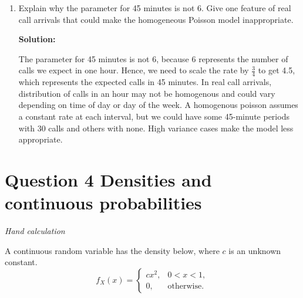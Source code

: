 \documentclass[11pt]{article}
\newcommand{\solution}{\par\medskip\noindent\textbf{Solution:}\par\vspace{0cm}}
\begin{document}
\begin{enumerate}[label=\textbf{(\alph*)}]
  Hence, now that we have the first and second moments of $Y$, we can derive the variance of $Y$:
  \[
  Var(Y) = \mathbb{E}Y^2 - (\mathbb{E}Y)^2 = 4.5^2 + 4.5 - 4.5^2 = 4.5 = \lambda
  \]


  \item Explain why the parameter for 45 minutes is not 6. Give one feature of real call arrivals that could make the homogeneous Poisson model inappropriate.
  \solution

  The parameter for 45 minutes is not 6, because 6 represents the number of calls we expect in one hour. Hence, we need to scale the rate by $\frac{3}{4}$ to get 4.5, which represents the expected calls in 45 minutes.
  In real call arrivals, distribution of calls in an hour may not be homogenous and could vary depending on time of day or day of the week. A homogenous poisson assumes a constant rate at each interval, but we could have some 45-minute periods with 30 calls and others with none. High variance cases make the model less appropriate.

\end{enumerate}

\newpage
\section*{Question 4 \quad Densities and continuous probabilities}
\textit{Hand calculation}

A continuous random variable has the density below, where $c$ is an unknown constant.
\[
f_X(x) =
\begin{cases}
cx^2, & 0 < x < 1, \\
0, & \text{otherwise.}
\end{cases}
\]
\end{document}

